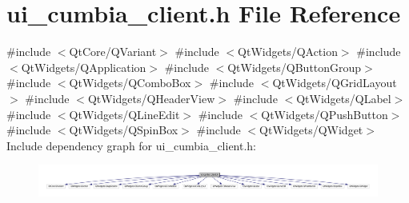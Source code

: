 \section{ui\+\_\+cumbia\+\_\+client.\+h File Reference}
\label{ui__cumbia__client_8h}
{\ttfamily \#include $<$Qt\+Core/\+Q\+Variant$>$}\newline
{\ttfamily \#include $<$Qt\+Widgets/\+Q\+Action$>$}\newline
{\ttfamily \#include $<$Qt\+Widgets/\+Q\+Application$>$}\newline
{\ttfamily \#include $<$Qt\+Widgets/\+Q\+Button\+Group$>$}\newline
{\ttfamily \#include $<$Qt\+Widgets/\+Q\+Combo\+Box$>$}\newline
{\ttfamily \#include $<$Qt\+Widgets/\+Q\+Grid\+Layout$>$}\newline
{\ttfamily \#include $<$Qt\+Widgets/\+Q\+Header\+View$>$}\newline
{\ttfamily \#include $<$Qt\+Widgets/\+Q\+Label$>$}\newline
{\ttfamily \#include $<$Qt\+Widgets/\+Q\+Line\+Edit$>$}\newline
{\ttfamily \#include $<$Qt\+Widgets/\+Q\+Push\+Button$>$}\newline
{\ttfamily \#include $<$Qt\+Widgets/\+Q\+Spin\+Box$>$}\newline
{\ttfamily \#include $<$Qt\+Widgets/\+Q\+Widget$>$}\newline
Include dependency graph for ui\+\_\+cumbia\+\_\+client.\+h\+:
\nopagebreak
\begin{figure}[H]
\begin{center}
\leavevmode
\includegraphics[width=350pt]{ui__cumbia__client_8h__incl}
\end{center}
\end{figure}

